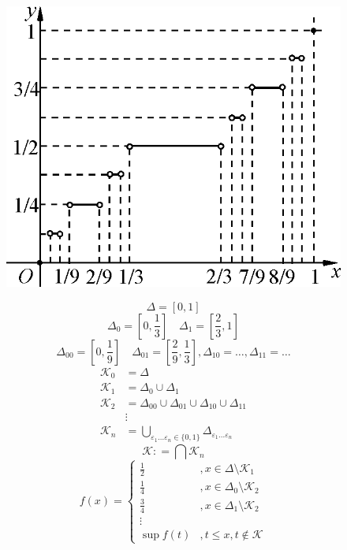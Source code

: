 \begin{example}
    \begin{figure}[h]
        \centering
        \includegraphics[scale=0.5]{images/cantor_ladder.png}
    \end{figure}
    \[\Delta = [0, 1]\]
    \[\Delta_0 = \left[0, \frac{1}{3}\right] \quad \Delta_1 = \left[\frac{2}{3}, 1\right]\]
    \[\Delta_{00} = \left[0, \frac{1}{9}\right] \quad \Delta_{01} = \left[\frac{2}{9}, \frac{1}{3}\right], \Delta_{10} = \dots, \Delta_{11} = \dots \]
    \begin{align*}
        \mathcal{K}_0 & = \Delta                                                                                               \\
        \mathcal{K}_1 & = \Delta_0\cup \Delta_1                                                                                \\
        \mathcal{K}_2 & = \Delta_{00}\cup \Delta_{01}\cup \Delta_{10}\cup \Delta_{11}                                          \\
                      & \vdots                                                                                                 \\
        \mathcal{K}_n & = \bigcup_{\varepsilon_1 \dots \varepsilon_n \in \{0, 1\} } \Delta_{\varepsilon_1 \dots \varepsilon_n}
    \end{align*}
    \[\mathcal{K} : = \bigcap \mathcal{K}_n\]
    \[f(x) = \begin{cases}
            \frac{1}{2} & , x\in \Delta\setminus \mathcal{K}_1   \\
            \frac{1}{4} & , x\in \Delta_0\setminus \mathcal{K}_2 \\
            \frac{3}{4} & , x\in \Delta_1\setminus \mathcal{K}_2 \\
            \vdots                                               \\
            \sup f(t)   & , t \leq x, t\not\in \mathcal{K}
        \end{cases}\]


\end{example}
